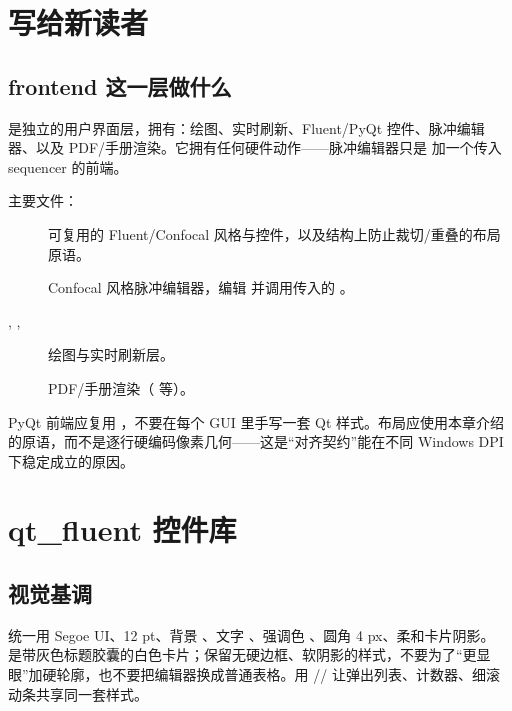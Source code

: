 \documentclass[11pt,oneside,openany]{book}
\begin{document}
\frontmatter
{}
\tableofcontents
\cleardoublepage
\mainmatter

\chapter{写给新读者}

\section{frontend 这一层做什么}
 是独立的用户界面层，拥有：绘图、实时刷新、Fluent/PyQt 控件、脉冲编辑器、以及 PDF/手册渲染。它拥有任何硬件动作——脉冲编辑器只是  加一个传入 sequencer 的前端。

主要文件：

\begin{description}
  \item[] 可复用的 Fluent/Confocal 风格与控件，以及结构上防止裁切/重叠的布局原语。
  \item[] Confocal 风格脉冲编辑器，编辑  并调用传入的 。
  \item[, , ] 绘图与实时刷新层。
  \item[] PDF/手册渲染（ 等）。
\end{description}

\begin{notebox}[一条总规则]
PyQt 前端应复用 ，不要在每个 GUI 里手写一套 Qt 样式。布局应使用本章介绍的原语，而不是逐行硬编码像素几何——这是“对齐契约”能在不同 Windows DPI 下稳定成立的原因。
\end{notebox}

\chapter{qt\_fluent 控件库}

\section{视觉基调}
统一用 Segoe UI、12 pt、背景 、文字 、强调色 、圆角 4 px、柔和卡片阴影。 是带灰色标题胶囊的白色卡片；保留无硬边框、软阴影的样式，不要为了“更显眼”加硬轮廓，也不要把编辑器换成普通表格。用 // 让弹出列表、计数器、细滚动条共享同一套样式。
\end{document}
